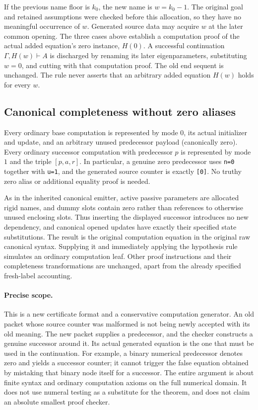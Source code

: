 If the previous name floor is $k_0$, the new name is $w=k_0-1$.
The original goal and retained assumptions were checked before this
allocation, so they have no meaningful occurrence of $w$.  Generated
source data may acquire $w$ at the later common opening.  The three
cases above establish a computation proof of the actual added equation's
zero instance, $H(0)$.  A successful continuation
\(\Gamma,H(w)\vdash A\) is discharged by renaming its later
eigenparameters, substituting $w=0$, and cutting with that computation
proof.  The old end sequent is unchanged.  The rule never asserts that
an arbitrary added equation $H(w)$ holds for every $w$.

\subsection{Canonical completeness without zero aliases}

Every ordinary base computation is represented by mode $0$, its actual
initializer and update, and an arbitrary unused predecessor payload
(canonically zero).  Every ordinary successor computation with
predecessor $p$ is represented by mode $1$ and the triple $[p,a,r]$.
In particular, a genuine zero predecessor uses \texttt{n=0} together
with \texttt{u=1}, and the generated source counter is exactly
\texttt{[0]}.  No truthy zero alias or additional equality proof is
needed.

As in the inherited canonical emitter, active passive parameters are
allocated rigid names, and dummy slots contain zero rather than
references to otherwise unused enclosing slots.  Thus inserting the
displayed successor introduces no new dependency, and canonical opened
updates have exactly their specified state substitutions.  The result
is the original computation equation in the original raw canonical
syntax.  Supplying it and immediately applying the hypothesis rule
simulates an ordinary computation leaf.  Other proof instructions and
their completeness transformations are unchanged, apart from the
already specified fresh-label accounting.

\paragraph{Precise scope.}
This is a new certificate format and a conservative computation generator.
An old packet whose source counter was malformed is not being newly
accepted with its old meaning.  The new packet supplies a predecessor,
and the checker constructs a genuine successor around it.  Its actual
generated equation is the one that must be used in the continuation.
For example, a binary numerical predecessor denotes zero and yields a
successor counter; it cannot trigger the false equation obtained by
mistaking that binary node itself for a successor.  The entire argument
is about finite syntax and ordinary computation axioms on the full
numerical domain.  It does not use numeral testing as a substitute for
the theorem, and does not claim an absolute smallest proof checker.

